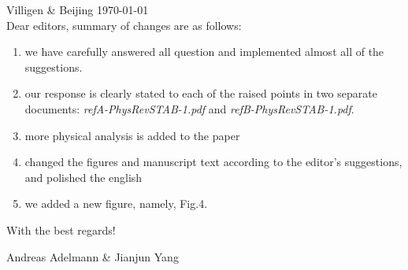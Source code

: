 \documentclass{article}
\begin{document}
Villigen \& Beijing \today \\

Dear editors, summary of changes are as follows:

\begin{enumerate}
\item we have carefully answered all question and implemented almost all
 of the suggestions. 
 \item our response is clearly stated to each of the raised points in two separate documents: {\em refA-PhysRevSTAB-1.pdf} and 
 {\em refB-PhysRevSTAB-1.pdf}.
\item more physical analysis is added to the paper 
\item changed the figures and manuscript text according to the editor's suggestions, and polished the english
\item we added a new figure, namely, Fig.4.
\end{enumerate}

With the best regards!

Andreas Adelmann \& Jianjun Yang

 
\end{document}
